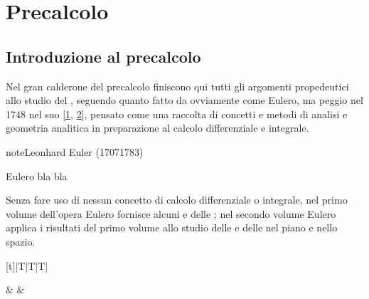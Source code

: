 \documentclass[letterpaper,10pt,italian]{jupyterBook}
\begin{document}
\sphinxstepscope


\part{Precalcolo}

\sphinxstepscope




\chapter{Introduzione al pre\sphinxhyphen{}calcolo}
\label{\detokenize{ch/precalculus:introduzione-al-pre-calcolo}}\label{\detokenize{ch/precalculus:math-hs-precalculus}}\label{\detokenize{ch/precalculus::doc}}
\sphinxAtStartPar
Nel gran calderone del pre\sphinxhyphen{}calcolo finiscono qui tutti gli argomenti propedeutici allo studio del {\hyperref[\detokenize{ch/calculus:math-hs-calculus}]{}}, seguendo quanto fatto da  \sphinxhyphen{} ovviamente come Eulero, ma peggio \sphinxhyphen{} nel 1748 nel suo  {[}\hyperlink{cite.ch/precalculus:id3}{1}, \hyperlink{cite.ch/precalculus:id4}{2}{]}, pensato come una raccolta di concetti e metodi di analisi e geometria analitica in preparazione al calcolo differenziale e integrale.

\begin{sphinxadmonition}{note}{Leonhard Euler (1707\sphinxhyphen{}1783)}

\sphinxAtStartPar
Eulero bla bla
\end{sphinxadmonition}

\sphinxAtStartPar
Senza fare uso di nessun concetto di calcolo differenziale o integrale, nel primo volume dell’opera Eulero fornisce alcuni  e delle ; nel secondo volume Eulero applica i risultati del primo volume allo studio delle  e delle  nel piano e nello spazio.


\begin{savenotes}\sphinxattablestart
\centering
\begin{tabulary}{\linewidth}[t]{|T|T|T|}
\hline

\sphinxAtStartPar
{}
&
\sphinxAtStartPar
{}
&
\sphinxAtStartPar
{}
\\
\hline
\end{tabulary}
\par
\sphinxattableend\end{savenotes}
\end{document}
